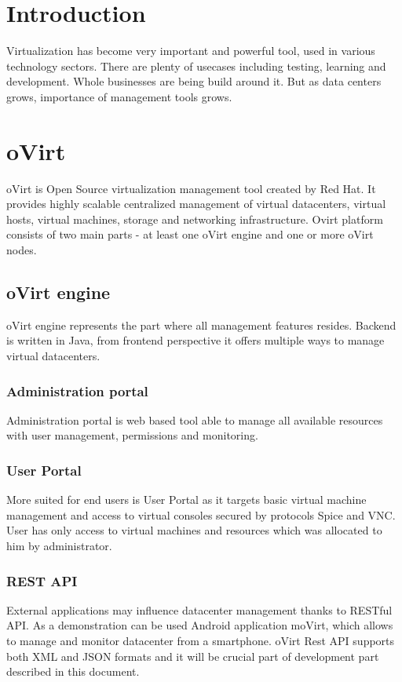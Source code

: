 
\chapter{Introduction}
Virtualization has become very important and powerful tool, used in various technology sectors. There are plenty of usecases including testing, learning and development. Whole businesses are being build around it. But as data centers grows, importance of management tools grows.

\chapter{oVirt}
oVirt is Open Source virtualization management tool created by Red Hat. It provides highly scalable centralized management of virtual datacenters, virtual hosts, virtual machines, storage and networking infrastructure. Ovirt platform consists of two main parts - at least one oVirt engine and one or more oVirt nodes.

\section{oVirt engine}
oVirt engine represents the part where all management features resides. Backend is written in Java, from frontend perspective it offers multiple ways to manage virtual datacenters.

\subsection{Administration portal}
Administration portal is web based tool able to manage all available resources with user management, permissions and monitoring. 

\subsection{User Portal}
More suited for end users is User Portal as it targets basic virtual machine management and access to virtual consoles secured by protocols Spice and VNC. User has only access to virtual machines and resources which was allocated to him by administrator.

\subsection{REST API}
External applications may influence datacenter management thanks to RESTful API. As a demonstration can be used Android application moVirt, which allows to manage and monitor datacenter from a smartphone. oVirt Rest API supports both XML and JSON formats and it will be crucial part of development part described in this document.

